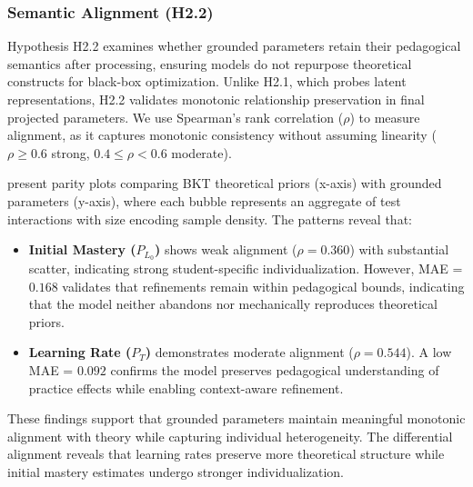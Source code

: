 \documentclass[applsci,article,submit,moreauthors,pdftex]{Definitions/mdpi}
\begin{document}
\subsubsection{Semantic Alignment (H2.2)} \label{sec_semantic_alignment}

Hypothesis H2.2 examines whether grounded parameters retain their pedagogical semantics after processing, ensuring models do not repurpose theoretical constructs for black-box optimization. Unlike H2.1, which probes latent representations, H2.2 validates monotonic relationship preservation in final projected parameters. We use Spearman's rank correlation ($\rho$) to measure alignment, as it captures monotonic consistency without assuming linearity ($\rho \geq 0.6$ strong, $0.4 \leq \rho < 0.6$ moderate).

 present parity plots comparing BKT theoretical priors (x-axis) with grounded parameters (y-axis), where each bubble represents an aggregate of test interactions with size encoding sample density. The patterns reveal that:

\begin{itemize}
    \item \textbf{Initial Mastery ($P_{L_0}$)} shows weak alignment ($\rho = 0.360$) with substantial scatter, indicating strong student-specific individualization. However, MAE = $0.168$ validates that refinements remain within pedagogical bounds, indicating that the model neither abandons nor mechanically reproduces theoretical priors.
    \item \textbf{Learning Rate ($P_T$)} demonstrates moderate alignment ($\rho = 0.544$). A low MAE = $0.092$ confirms the model preserves pedagogical understanding of practice effects while enabling context-aware refinement.
\end{itemize}

These findings support that grounded parameters maintain meaningful monotonic alignment with theory while capturing individual heterogeneity. The differential alignment reveals that learning rates preserve more theoretical structure while initial mastery estimates undergo stronger individualization.
\end{document}
